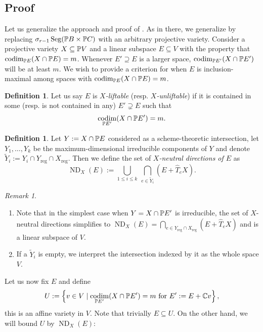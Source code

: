 \documentclass[a4paper,10pt]{article}
\def\reg{\text{reg}}
\def\set#1{\left\{#1\right\}}
\DeclareMathOperator{\codim}{codim}
\DeclareMathOperator{\ND}{ND}
\DeclareMathOperator{\Seg}{Seg}
\theoremstyle{definition}
\newtheorem{definition}[theorem]{Definition}
\theoremstyle{remark}
\newtheorem*{remark}{Remark}
\begin{document}


\subsection{Proof}

Let us generalize the approach and proof of \cite[Section 3]{draisma}. As in there, we generalize by replacing $\sigma_{r-1} \Seg(\pe B\times\pe C)$ with an arbitrary projective variety. Consider a projective variety $X\subseteq \pe V$ and a linear subspace $E\subseteq V$ with the property that $\codim_{\pe E}(X \cap \pe E) = m$. Whenever $E'\supseteq E$ is a larger space, $\codim_{\pe E'}(X\cap \pe E')$ will be at least $m$. We wish to provide a criterion for when $E$ is inclusion-maximal among spaces with $\codim_{\pe E}(X\cap \pe E)=m$.

\begin{definition}
    Let us say $E$ is \emph{$X$-liftable} (resp. \emph{$X$-unliftable}) if it is contained in some (resp. is not contained in any) $E'\supsetneq E$ such that
    \[
        \codim_{\pe E'} (X\cap \pe E') = m.
    \]
\end{definition}

\begin{definition}
    \label{def:NDX}
    Let $Y:=X\cap\pe E$ considered as a scheme-theoretic intersection, let $Y_1,\dots,Y_k$ be the maximum-dimensional irreducible components of $Y$ and denote $\tilde Y_i := Y_i\cap Y_\reg\cap X_\reg$.
    Then we define the set of \emph{$X$-neutral directions of $E$} as
    \[
        \ND_X(E) := \bigcup_{1\leq i\leq k}\ \bigcap_{e\in \tilde Y_i}(E+\hat T_{e}X).
    \]
\end{definition}
\begin{remark}
    \begin{enumerate}
    \item Note that in the simplest case when $Y=X\cap \pe E'$ is irreducible, the set of $X$-neutral directions simplifies to
    $\ND_X(E) = \bigcap_{e\in Y_\reg\cap X_\reg} (E+\hat T_e X)$ and is a linear subspace of $V$.
    \item If a $\tilde Y_i$ is empty, we interpret the intersection indexed by it as the whole space $V$.
    \end{enumerate}
\end{remark}


Let us now fix $E$ and define
\[
    U := \set{v\in V\mid \text{$\codim_{\pe E'}(X\cap \pe E')=m$ for $E':= E+\ce v$}},
\]
this is an affine variety in $V$. Note that trivially $E\subseteq U$. On the other hand, we will bound $U$ by $\ND_X(E)$:
\end{document}

